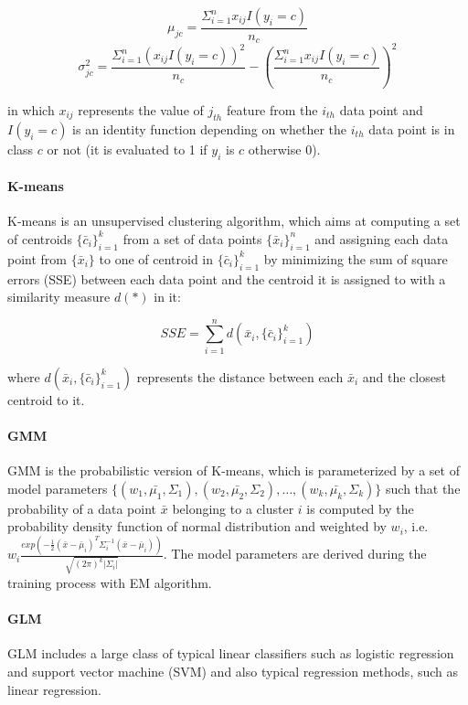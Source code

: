 \begin{equation}\label{eq: nb_mean}
    \mu_{jc} = \frac{\Sigma_{i=1}^nx_{ij}I(y_i=c)}{n_c}
\end{equation}
\begin{equation}\label{eq: nb_var}
    \sigma_{jc}^2 = \frac{\Sigma_{i=1}^n(x_{ij}I(y_i=c))^2}{n_c}-(\frac{\Sigma_{i=1}^nx_{ij}I(y_i=c)}{n_c})^2
\end{equation}

in which $x_{ij}$ represents the value of $j_{th}$ feature from the $i_{th}$ data point and $I(y_i=c)$ is an identity function depending on whether the $i_{th}$ data point is in class $c$ or not (it is evaluated to 1 if $y_i$ is $c$ otherwise 0).

\paragraph{K-means} K-means is an unsupervised clustering algorithm, which aims at computing a set of centroids $\{\bar{c}_i\}_{i=1}^k$ from a set of data points $\{\bar{x}_i\}_{i=1}^n$ and assigning each data point from $\{\bar{x}_i\}$ to one of centroid in $\{\bar{c}_i\}_{i=1}^k$ by minimizing the sum of square errors (SSE) between each data point and the centroid it is assigned to with a similarity measure $d(*)$ in it:

\begin{equation}\label{eq: sse_k_means}
    SSE = \sum_{i=1}^nd(\bar{x}_i, \{\bar{c}_i\}_{i=1}^k)
\end{equation}

where $d(\bar{x}_i, \{\bar{c}_i\}_{i=1}^k)$ represents the distance between each $\bar{x}_i$ and the closest centroid to it.

\paragraph{GMM} GMM is the probabilistic version of K-means, which is parameterized by a set of model parameters $\{(w_1, \bar{\mu_1}, \Sigma_1), (w_2, \bar{\mu_2}, \Sigma_2), \dots, (w_k, \bar{\mu_k}, \Sigma_k)\}$ such that the probability of a data point $\bar{x}$ belonging to a cluster $i$ is computed by the probability density function of normal distribution and weighted by $w_i$, i.e.  $w_i\frac{exp(-\frac{1}{2}(\bar{x}-\bar{\mu}_i)^T\Sigma_i^{-1}(\bar{x}-\bar{\mu}_i))}{\sqrt{(2\pi)^k|\Sigma_i|}}$. The model parameters are derived during the training process with EM algorithm.

\paragraph{GLM} GLM includes a large class of typical linear classifiers such as logistic regression and support vector machine (SVM) and also typical regression methods, such as linear regression.